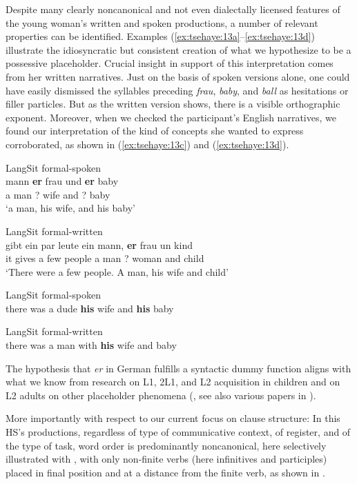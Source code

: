 \documentclass[output=paper]{langscibook}
\begin{document}
Despite many clearly noncanonical and not even dialectally licensed features of the young woman’s written and spoken productions, a number of relevant properties can be identified. Examples (\ref{ex:tsehaye:13a}--\ref{ex:tsehaye:13d}) illustrate the idiosyncratic but consistent creation of what we hypothesize to be a possessive placeholder. Crucial insight in support of this interpretation comes from her written narratives. Just on the basis of spoken versions alone, one could have easily dismissed the syllables preceding \textit{frau}, \textit{baby}, and \textit{ball} as hesitations or filler particles. But as the written version  shows, there is a visible orthographic exponent. Moreover, when we checked the participant’s English narratives, we found our interpretation of the kind of concepts she wanted to express corroborated, as shown in (\ref{ex:tsehaye:13c}) and (\ref{ex:tsehaye:13d}).

\ea%
    \label{ex:tsehaye:13}
\ea \label{ex:tsehaye:13a} LangSit formal-spoken\\
 {mann} \textbf{{er}} {frau} {und} \textbf{{er}} {baby}\\
a man ? wife and ? baby\\
\glt ‘a man, his wife, and his baby’

\ex \label{ex:tsehaye:13b} LangSit formal-written\\
 {gibt} {ein} {par} {leute} {ein} {mann,} \textbf{{er}} {frau} {un} {kind}\\
it gives a few people a man ? woman and child\\
\glt ‘There were a few people. A man, his wife and child’

\ex \label{ex:tsehaye:13c} LangSit formal-spoken\\
{there was a dude} \textbf{{his}} {wife and} \textbf{{his}} {baby}

\ex \label{ex:tsehaye:13d} LangSit formal-written\\
{there was a man with} \textbf{{his}} {wife and baby}
\z
\z

The hypothesis that \textit{er} in German fulfills a syntactic dummy function aligns with what we know from research on L1, 2L1, and L2 acquisition in children and on L2 adults on other placeholder phenomena (\citealt{DaskalakiEtAl2019,Tracy2011}, see also various papers in \citealt{BlomCraatsVerhagen2013}).

More importantly with respect to our current focus on clause structure: In this HS’s productions, regardless of type of communicative context, of register, and of the type of task, word order is predominantly noncanonical, here selectively illustrated with , with only non-finite verbs (here infinitives and participles) placed in final position and at a distance from the finite verb, as shown in .
\end{document}
